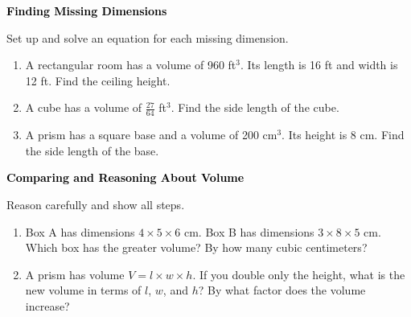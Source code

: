 \documentclass[12pt, letterpaper, fleqn]{article}
\begin{document}
\newpage

\begin{tcolorbox}[colback=black!10]
\large\textcolor{black}{\textbf{Finding Missing Dimensions}}
\end{tcolorbox}

\noindent
Set up and solve an equation for each missing dimension.

\vspace{3mm}

\begin{enumerate}[itemsep=2.3cm, leftmargin=0.6cm]

\item A rectangular room has a volume of 960 ft$^3$. Its length is 16 ft and width is 12 ft. Find the ceiling height.

\vspace{2.2cm}

\item A cube has a volume of $\frac{27}{64}$ ft$^3$. Find the side length of the cube.

\vspace{2.2cm}

\item A prism has a square base and a volume of 200 cm$^3$. Its height is 8 cm. Find the side length of the base.

\vspace{2.5cm}

\end{enumerate}

\newpage

\begin{tcolorbox}[colback=black!10]
\large\textcolor{black}{\textbf{Comparing and Reasoning About Volume}}
\end{tcolorbox}

\noindent
Reason carefully and show all steps.

\vspace{3mm}

\begin{enumerate}[itemsep=2.3cm, leftmargin=0.6cm]

\item Box A has dimensions $4 \times 5 \times 6$ cm. Box B has dimensions $3 \times 8 \times 5$ cm. Which box has the greater volume? By how many cubic centimeters?

\vspace{5cm}

\item A prism has volume $V = l \times w \times h$. If you double only the height, what is the new volume in terms of $l$, $w$, and $h$? By what factor does the volume increase?

\vspace{2.5cm}

\end{enumerate}
\end{document}
